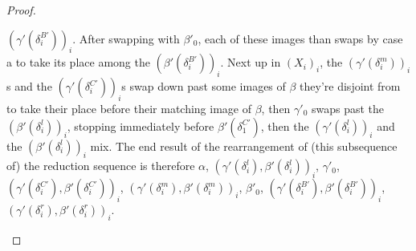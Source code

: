 \begin{proof}
\begin{itemize}
$(\gamma'(\delta^{B'}_i))_i$. After swapping with $\beta'_0$, each of these images than swaps by case a to take its place among the $(\beta'(\delta^{B'}_i))_i$. Next up in $(X_i)_i$, the $(\gamma'(\delta^m_i))_i$s and the $(\gamma'(\delta^{C'}_i))_i$s swap down past some images of $\beta$ they're disjoint from to take their place before their matching image of $\beta$, then $\gamma'_0$ swaps past the $(\beta'(\delta^l_i))_i$, stopping immediately before $\beta'(\delta^{C'}_1)$, then the $(\gamma'(\delta^l_i))_i$ and the $(\beta'(\delta^l_i))_i$ mix. The end result of the rearrangement of (this subsequence of) the reduction sequence is therefore $\alpha$, $(\gamma'(\delta^l_i), \beta'(\delta^l_i))_i$, $\gamma'_0$, $(\gamma'(\delta^{C'}_i), \beta'(\delta^{C'}_i))_i$, $(\gamma'(\delta^m_i), \beta'(\delta^m_i))_i$, $\beta'_0$, $(\gamma'(\delta^{B'}_i), \beta'(\delta^{B'}_i))_i$, $(\gamma'(\delta^r_i), \beta'(\delta^r_i))_i$.


\end{itemize}
\end{proof}
